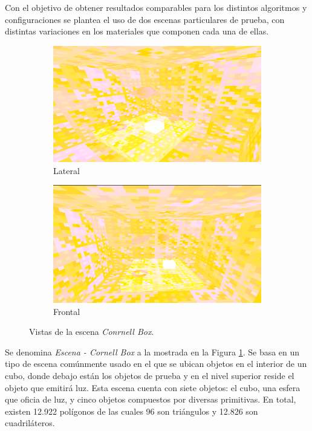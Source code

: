 Con el objetivo de obtener resultados comparables para los distintos algoritmos y configuraciones se plantea el uso de dos escenas particulares de prueba, con distintas variaciones en los materiales que componen cada una de ellas.


\begin{figure}[htbp]
	\centering
	\begin{subfigure}{0.45\textwidth}
		\includegraphics[width=1\linewidth]{assets/cornell}
		\caption{Lateral}
	\end{subfigure}
	\begin{subfigure}{0.45\textwidth}
		\includegraphics[width=1\linewidth]{assets/cornell2}
		\caption{Frontal}
	\end{subfigure}
	\caption{Vistas de la escena \textit{Conrnell Box}.}
	\label{img:cornell}
\end{figure}

Se denomina \textit{Escena - Cornell Box} a la mostrada en la Figura \ref{img:cornell}. Se basa en un tipo de escena comúnmente usado en el que se ubican objetos en el interior de un cubo, donde debajo están los objetos de prueba y en el nivel superior reside el objeto que emitirá luz. Esta escena cuenta con siete objetos: el cubo, una esfera que oficia de luz, y cinco objetos compuestos por diversas primitivas. En total, existen 12.922 polígonos de las cuales 96 son triángulos y 12.826 son cuadriláteros.

